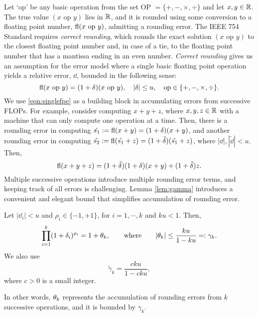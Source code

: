 Let `op' be any basic operation from the set OP $=\{+, -, \times, \div\}$ and let $x,y\in \mathbb{R}$.
The true value $(x\text{ op }y)$ lies in $\mathbb{R}$, and it is rounded using some conversion to a floating point number, $\mathrm{fl}(x\text{ op }y)$, admitting a rounding error. 
The IEEE 754 Standard requires \emph{correct rounding}, which rounds the exact solution $(x\text{ op }y)$ to the closest floating point number and, in case of a tie, to the floating point number that has a mantissa ending in an even number.
\emph{Correct rounding} gives us an assumption for the error model where a single basic floating point operation yields a relative error, $\dd$, bounded in the following sense:
\begin{equation}
\fl(x\text{ op }y) = (1 + \dd)(x\text{ op }y),\quad |\dd|\leq u, \quad \text{op}\in\{+, -, \times, \div\}. \label{eqn:singlefpe}
\end{equation}
We use \cref{eqn:singlefpe} as a building block in accumulating errors from successive FLOPs.
For example, consider computing $x+y+z$, where $x,y,z\in\mathbb{R}$ with a machine that can only compute one operation at a time.
Then, there is a rounding error in computing $\hat{s_1}:= \mathrm{fl}(x+y) = (1+\delta)(x+y)$, and another rounding error in computing $\hat{s_2}:= \mathrm{fl}(\hat{s_1}+ z) = (1+\tilde{\delta})(\hat{s_1}+z)$, where $|\dd|,|\tilde{\dd}|<u$.
Then, 
\begin{equation}
\fl(x+y+z) = (1+\tilde{\dd})(1+\dd) (x+y) + (1+\tilde{\dd}) z.\label{eqn:FPbasic3}
\end{equation}
Multiple successive operations introduce multiple rounding error terms, and keeping track of all errors is challenging.
Lemma \ref{lem:gamma} introduces a convenient and elegant bound that simplifies accumulation of rounding error. 
\begin{lemma}
	\label{lem:gamma}
	Let $|\dd_i|<u$ and $\rho_i \in\{-1, +1\}$, for $i = 1 , \cdots, k$ and $ku < 1$. Then, 
	\begin{equation}
	\prod_{i=1}^k (1+\delta_i)^{\rho_i} = 1 + \theta_{k},
	\qquad \mbox{where} \qquad
	|\theta_{k}|\leq \frac{ku}{1-ku}=:\gamma_{k}.
	\end{equation}
	We also use 
	\begin{equation*}
	\tilde{\gamma}_{k} = \frac{cku}{1-cku},
	\end{equation*}
	where $c>0$ is a small integer.  
\end{lemma}
In other words, $\theta_{k}$ represents the accumulation of rounding errors from $k$ successive operations, and it is bounded by $\gamma_{k}$. 
